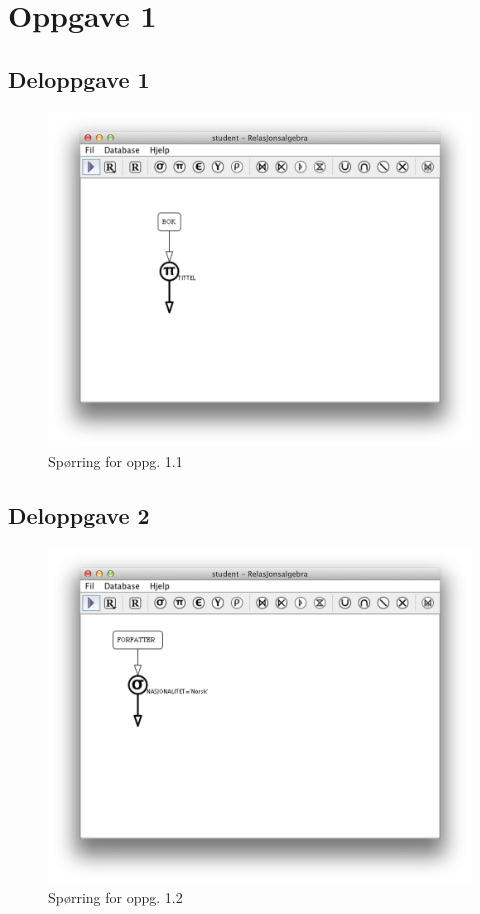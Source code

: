 \documentclass[a4paper, 12pt] {article}
\begin{document}

\newpage

\tableofcontents
\newpage


\section{Oppgave 1}

\subsection{Deloppgave 1}
\begin{figure}[h!]
    \includegraphics[width=\linewidth]{img/1-1.png}
    \caption{Spørring for oppg. 1.1 \label{img:1.1}}
\end{figure}
\newpage

\subsection{Deloppgave 2}
\begin{figure}[h!]
    \includegraphics[width=\linewidth]{img/1-2.png}
    \caption{Spørring for oppg. 1.2 \label{img:1.2}}
\end{figure}
\newpage
\end{document}
